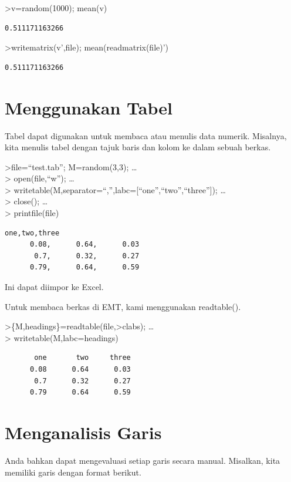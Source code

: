 \documentclass[
]{book}
\begin{document}
\textgreater v=random(1000); mean(v)

\begin{verbatim}
0.511171163266
\end{verbatim}

\textgreater writematrix(v',file); mean(readmatrix(file)')

\begin{verbatim}
0.511171163266
\end{verbatim}

\section{Menggunakan Tabel}\label{menggunakan-tabel}

Tabel dapat digunakan untuk membaca atau menulis data numerik. Misalnya, kita menulis tabel dengan tajuk baris dan kolom ke dalam sebuah berkas.

\textgreater file=``test.tab''; M=random(3,3); \ldots{}\\
\textgreater{} open(file,``w''); \ldots{}\\
\textgreater{} writetable(M,separator=``,'',labc={[}``one'',``two'',``three''{]}); \ldots{}\\
\textgreater{} close(); \ldots{}\\
\textgreater{} printfile(file)

\begin{verbatim}
one,two,three
      0.08,      0.64,      0.03
       0.7,      0.32,      0.27
      0.79,      0.64,      0.59
\end{verbatim}

Ini dapat diimpor ke Excel.

Untuk membaca berkas di EMT, kami menggunakan readtable().

\textgreater\{M,headings\}=readtable(file,\textgreater clabs); \ldots{}\\
\textgreater{} writetable(M,labc=headings)

\begin{verbatim}
       one       two     three
      0.08      0.64      0.03
       0.7      0.32      0.27
      0.79      0.64      0.59
\end{verbatim}

\section{Menganalisis Garis}\label{menganalisis-garis}

Anda bahkan dapat mengevaluasi setiap garis secara manual. Misalkan, kita memiliki garis dengan format berikut.
\end{document}
